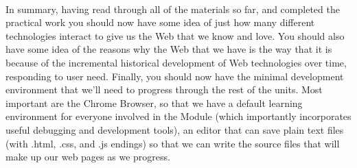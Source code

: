 \paragraph{} In summary, having read through all of the materials so far, and completed the practical work you should now have some idea of just how many different technologies interact to give us the Web that we know and love. You should also have some idea of the reasons why the Web that we have is the way that it is because of the incremental historical development of Web technologies over time, responding to user need. Finally, you should now have the minimal development environment that we'll need to progress through the rest of the units. Most important are the Chrome Browser, so that we have a default learning environment for everyone involved in the Module (which importantly incorporates useful debugging and development tools), an editor that can save plain text files (with .html, .css, and .js endings) so that we can write the source files that will make up our web pages as we progress.


